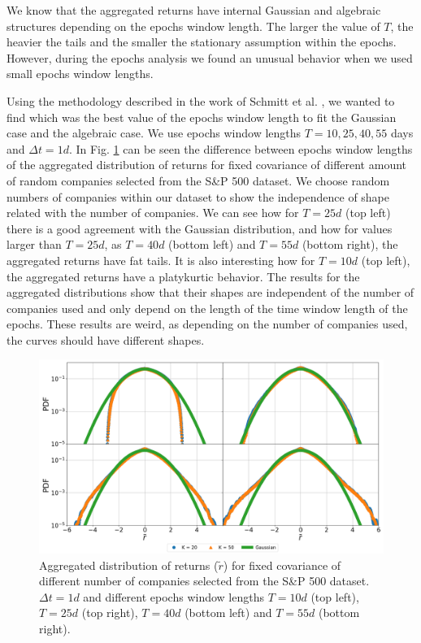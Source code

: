 We know that the aggregated returns have internal Gaussian and algebraic
structures depending on the epochs window length. The larger the value of $T$,
the heavier the tails and the smaller the stationary assumption within the
epochs. However, during the epochs analysis we found an unusual behavior when
we used small epochs window lengths.

Using the methodology described in the work of Schmitt et al.
\cite{non_stationarity_fin_guhr}, we wanted to find which was the best value of
the epochs window length to fit the Gaussian case and the algebraic case. We
use epochs window lengths $T = 10, 25, 40, 55$ days and $\Delta t = 1d$. In
Fig. \ref{fig:window_comparison} can be seen the difference between epochs
window lengths of the aggregated distribution of returns for fixed covariance
of different amount of random companies selected from the S\&P 500 dataset. We
choose random numbers of companies within our dataset to show the independence
of shape related with the number of companies. We can see how for $T=25d$
(top left) there is a good agreement with the Gaussian distribution, and how
for values larger than $T=25d$, as $T=40d$ (bottom left) and $T=55d$
(bottom right), the aggregated returns have fat tails. It is also interesting
how for $T=10d$ (top left), the aggregated returns have a platykurtic behavior.
The results for the aggregated distributions show that their shapes are
independent of the number of companies used and only depend on the length of
the time window length of the epochs. These results are weird, as depending on
the number of companies used, the curves should have different shapes.

\begin{figure}[htbp]
    \centering
    \includegraphics[width=0.8\columnwidth]
    {figures/05_window_comparison.png}
    \caption{Aggregated distribution of returns ($\tilde{r}$) for fixed
             covariance of different number of companies selected from the S\&P
             500 dataset. $\Delta t = 1d$ and different epochs window lengths
             $T=10d$ (top left), $T=25d$ (top right), $T=40d$ (bottom left) and
             $T=55d$ (bottom right).}
    \label{fig:window_comparison}
\end{figure}

